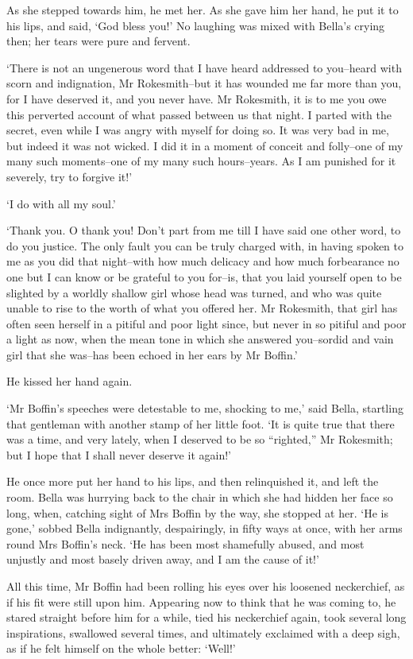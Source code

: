 As she stepped towards him, he met her. As she gave him her hand, he put
it to his lips, and said, ‘God bless you!’ No laughing was mixed with
Bella’s crying then; her tears were pure and fervent.

‘There is not an ungenerous word that I have heard addressed to
you--heard with scorn and indignation, Mr Rokesmith--but it has wounded
me far more than you, for I have deserved it, and you never have. Mr
Rokesmith, it is to me you owe this perverted account of what passed
between us that night. I parted with the secret, even while I was angry
with myself for doing so. It was very bad in me, but indeed it was not
wicked. I did it in a moment of conceit and folly--one of my many such
moments--one of my many such hours--years. As I am punished for it
severely, try to forgive it!’

‘I do with all my soul.’

‘Thank you. O thank you! Don’t part from me till I have said one other
word, to do you justice. The only fault you can be truly charged with,
in having spoken to me as you did that night--with how much delicacy
and how much forbearance no one but I can know or be grateful to you
for--is, that you laid yourself open to be slighted by a worldly shallow
girl whose head was turned, and who was quite unable to rise to the
worth of what you offered her. Mr Rokesmith, that girl has often seen
herself in a pitiful and poor light since, but never in so pitiful
and poor a light as now, when the mean tone in which she answered
you--sordid and vain girl that she was--has been echoed in her ears by
Mr Boffin.’

He kissed her hand again.

‘Mr Boffin’s speeches were detestable to me, shocking to me,’ said
Bella, startling that gentleman with another stamp of her little
foot. ‘It is quite true that there was a time, and very lately, when I
deserved to be so “righted,” Mr Rokesmith; but I hope that I shall never
deserve it again!’

He once more put her hand to his lips, and then relinquished it, and
left the room. Bella was hurrying back to the chair in which she had
hidden her face so long, when, catching sight of Mrs Boffin by the
way, she stopped at her. ‘He is gone,’ sobbed Bella indignantly,
despairingly, in fifty ways at once, with her arms round Mrs Boffin’s
neck. ‘He has been most shamefully abused, and most unjustly and most
basely driven away, and I am the cause of it!’

All this time, Mr Boffin had been rolling his eyes over his loosened
neckerchief, as if his fit were still upon him. Appearing now to think
that he was coming to, he stared straight before him for a while, tied
his neckerchief again, took several long inspirations, swallowed several
times, and ultimately exclaimed with a deep sigh, as if he felt himself
on the whole better: ‘Well!’

